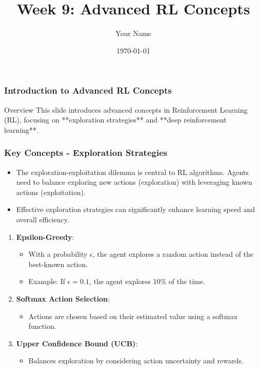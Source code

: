 \documentclass{beamer}
\title{Week 9: Advanced RL Concepts}
\author{Your Name}
\institute{Your Institution}
\date{\today}
\begin{document}
\frame{\titlepage}

\begin{frame}[fragile]
    \titlepage
\end{frame}

\begin{frame}[fragile]
    \frametitle{Introduction to Advanced RL Concepts}
    
    \begin{block}{Overview}
    This slide introduces advanced concepts in Reinforcement Learning (RL), focusing on **exploration strategies** and **deep reinforcement learning**.
    \end{block}
\end{frame}

\begin{frame}[fragile]
    \frametitle{Key Concepts - Exploration Strategies}
    
    \begin{itemize}
        \item The exploration-exploitation dilemma is central to RL algorithms. Agents need to balance exploring new actions (exploration) with leveraging known actions (exploitation).
        \item Effective exploration strategies can significantly enhance learning speed and overall efficiency.
    \end{itemize}
    
    \begin{enumerate}
        \item \textbf{Epsilon-Greedy}:
        \begin{itemize}
            \item With a probability $\epsilon$, the agent explores a random action instead of the best-known action.
            \item Example: If $\epsilon = 0.1$, the agent explores 10\% of the time.
        \end{itemize}
        
        \item \textbf{Softmax Action Selection}:
        \begin{itemize}
            \item Actions are chosen based on their estimated value using a softmax function.
        \end{itemize}
        
        \item \textbf{Upper Confidence Bound (UCB)}:
        \begin{itemize}
            \item Balances exploration by considering action uncertainty and rewards.
        \end{itemize}
    \end{enumerate}
\end{frame}
\end{document}
